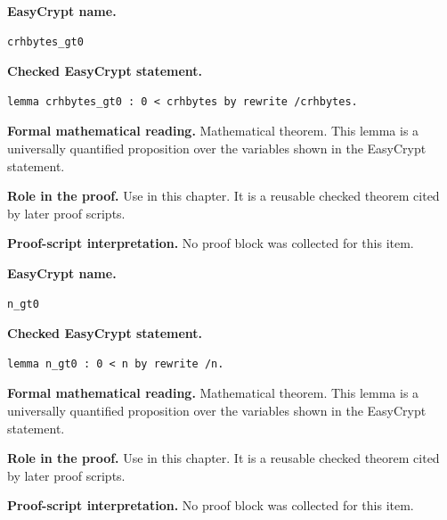 \begin{formaltheorem}
\noindent\textbf{EasyCrypt name.}
\begin{lstlisting}[language=EasyCrypt,basicstyle=\ttfamily\scriptsize]
crhbytes_gt0
\end{lstlisting}
\noindent\textbf{Checked EasyCrypt statement.}
\begin{lstlisting}[language=EasyCrypt,basicstyle=\ttfamily\scriptsize]
lemma crhbytes_gt0 : 0 < crhbytes by rewrite /crhbytes.
\end{lstlisting}
\noindent\textbf{Formal mathematical reading.}
Mathematical theorem. This lemma is a universally quantified proposition over the variables shown in the EasyCrypt statement.

\noindent\textbf{Role in the proof.}
Use in this chapter. It is a reusable checked theorem cited by later proof scripts.

\noindent\textbf{Proof-script interpretation.}
No proof block was collected for this item.

\end{formaltheorem}

\begin{formaltheorem}
\noindent\textbf{EasyCrypt name.}
\begin{lstlisting}[language=EasyCrypt,basicstyle=\ttfamily\scriptsize]
n_gt0
\end{lstlisting}
\noindent\textbf{Checked EasyCrypt statement.}
\begin{lstlisting}[language=EasyCrypt,basicstyle=\ttfamily\scriptsize]
lemma n_gt0 : 0 < n by rewrite /n.
\end{lstlisting}
\noindent\textbf{Formal mathematical reading.}
Mathematical theorem. This lemma is a universally quantified proposition over the variables shown in the EasyCrypt statement.

\noindent\textbf{Role in the proof.}
Use in this chapter. It is a reusable checked theorem cited by later proof scripts.

\noindent\textbf{Proof-script interpretation.}
No proof block was collected for this item.

\end{formaltheorem}

